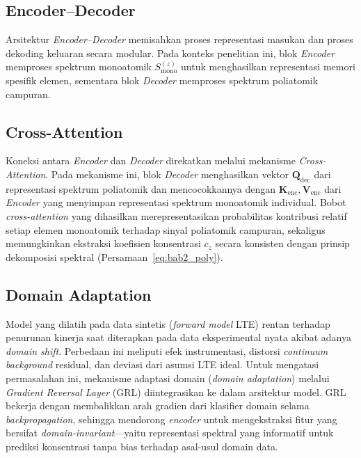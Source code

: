 \subsection{Encoder--Decoder}

Arsitektur \textit{Encoder--Decoder} memisahkan proses representasi masukan dan proses dekoding keluaran secara modular. Pada konteks penelitian ini, blok \textit{Encoder} memproses spektrum monoatomik $S_{\text{mono}}^{(z)}$ untuk menghasilkan representasi memori spesifik elemen, sementara blok \textit{Decoder} memproses spektrum poliatomik campuran.

\subsection{Cross-Attention}

Koneksi antara \textit{Encoder} dan \textit{Decoder} direkatkan melalui mekanisme \textit{Cross-Attention}. Pada mekanisme ini, blok \textit{Decoder} menghasilkan vektor $\mathbf{Q}_{\text{dec}}$ dari representasi spektrum poliatomik dan mencocokkannya dengan $\mathbf{K}_{\text{enc}}, \mathbf{V}_{\text{enc}}$ dari \textit{Encoder} yang menyimpan representasi spektrum monoatomik individual. Bobot \textit{cross-attention} yang dihasilkan merepresentasikan probabilitas kontribusi relatif setiap elemen monoatomik terhadap sinyal poliatomik campuran, sekaligus memungkinkan ekstraksi koefisien konsentrasi $c_z$ secara konsisten dengan prinsip dekomposisi spektral (Persamaan~\ref{eq:bab2_poly}).

\subsection{Domain Adaptation}

Model yang dilatih pada data sintetis (\textit{forward model} LTE) rentan terhadap penurunan kinerja saat diterapkan pada data eksperimental nyata akibat adanya \textit{domain shift}. Perbedaan ini meliputi efek instrumentasi, distorsi \textit{continuum background} residual, dan deviasi dari asumsi LTE ideal. Untuk mengatasi permasalahan ini, mekanisme adaptasi domain (\textit{domain adaptation}) melalui \textit{Gradient Reversal Layer} (GRL) \citep{ganin_domain_2016} diintegrasikan ke dalam arsitektur model. GRL bekerja dengan membalikkan arah gradien dari klasifier domain selama \textit{backpropagation}, sehingga mendorong \textit{encoder} untuk mengekstraksi fitur yang bersifat \textit{domain-invariant}---yaitu representasi spektral yang informatif untuk prediksi konsentrasi tanpa bias terhadap asal-usul domain data.

